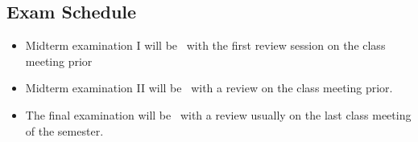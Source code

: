 
\subsection*{Exam Schedule}\label{subsec:exam_schedule}

\begin{itemize}
\itemsep -0.0em 
\item Midterm examination I will be \midtermonedateandlocation~with the first review session on the class meeting prior
\item Midterm examination II will be \midtermtwodateandlocation~with a review on the class meeting prior.
\item The final examination will be \finaldateandlocation~with a review usually on the last class meeting of the semester.
\end{itemize}